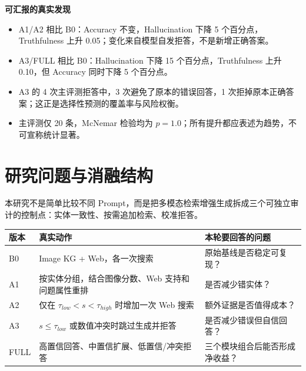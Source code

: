 \documentclass[11pt,a4paper,fontset=none]{ctexart}
\begin{document}
\vspace{0.7em}
\begin{resultbox}
\textbf{可汇报的真实发现}
\begin{itemize}
  \item A1/A2 相比 B0：Accuracy 不变，Hallucination 下降 5 个百分点，Truthfulness 上升 0.05；变化来自模型自发拒答，不是新增正确答案。
  \item A3/FULL 相比 B0：Hallucination 下降 15 个百分点，Truthfulness 上升 0.10，但 Accuracy 同时下降 5 个百分点。
  \item A3 的 4 次主评测拒答中，3 次避免了原本的错误回答，1 次拒掉原本正确答案；这正是选择性预测的覆盖率与风险权衡。
  \item 主评测仅 20 条，McNemar 检验均为 $p=1.0$；所有提升都应表述为趋势，不可宣称统计显著。
\end{itemize}
\end{resultbox}

\section{研究问题与消融结构}
本研究不是简单比较不同 Prompt，而是把多模态检索增强生成拆成三个可独立审计的控制点：实体一致性、按需追加检索、校准拒答。

\begin{center}
\end{center}

\begin{tabularx}{\textwidth}{@{}lYY@{}}
\toprule
版本 & 真实动作 & 本轮要回答的问题 \\
\midrule
B0 & Image KG + Web，各一次搜索 & 原始基线是否稳定可复现？ \\
A1 & 按实体分组，结合图像分数、Web 支持和问题属性重排 & 是否减少错实体？ \\
A2 & 仅在 $\tau_{low}<s<\tau_{high}$ 时增加一次 Web 搜索 & 额外证据是否值得成本？ \\
A3 & $s\leq\tau_{low}$ 或数值冲突时跳过生成并拒答 & 是否减少错误但自信回答？ \\
FULL & 高置信回答、中置信扩展、低置信/冲突拒答 & 三个模块组合后能否形成净收益？ \\
\bottomrule
\end{tabularx}
\end{document}
